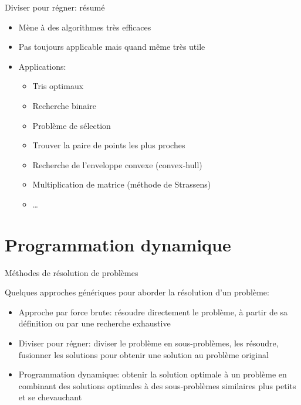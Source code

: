 \begin{frame}{Diviser pour régner: résumé}

\begin{itemize}
\item Mène à des algorithmes très efficaces
\item Pas toujours applicable mais quand même très utile

\bigskip

\item Applications:
\begin{itemize}
\item Tris optimaux
\item Recherche binaire
\item Problème de sélection
\item Trouver la paire de points les plus proches
\item Recherche de l'enveloppe convexe (convex-hull)
\item Multiplication de matrice (méthode de Strassens)
\item \ldots
\end{itemize}
\end{itemize}

\end{frame}

\section{Programmation dynamique}

\begin{frame}{Méthodes de résolution de problèmes}

Quelques approches génériques pour aborder la résolution d'un problème:
\begin{itemize}
\item \alert{Approche par force brute:} résoudre directement le problème, à partir de sa définition ou par une recherche exhaustive
\item \alert{Diviser pour régner:} diviser le problème en sous-problèmes, les résoudre, fusionner les solutions pour obtenir une solution au problème original
\item \alert{Programmation dynamique:} obtenir la solution optimale à un problème en combinant des solutions optimales à des sous-problèmes similaires plus petits et se chevauchant
\end{itemize}

\end{frame}

